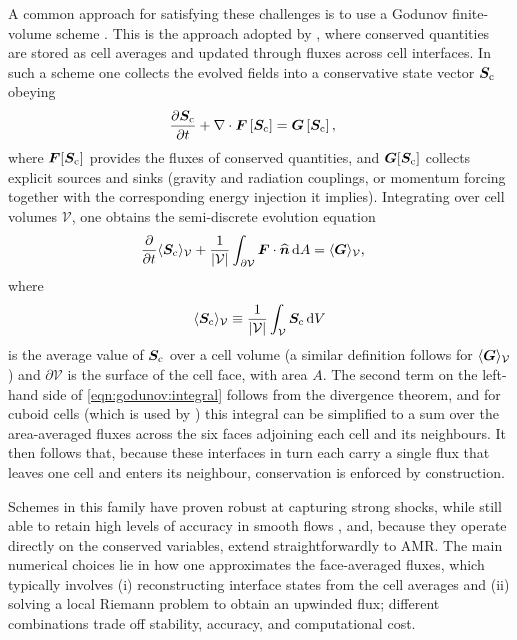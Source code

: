 A common approach for satisfying these challenges is to use a Godunov finite-volume scheme \citep{Toro97a}. This is the approach adopted by \quokka, where conserved quantities are stored as cell averages and updated through fluxes across cell interfaces. In such a scheme one collects the evolved fields into a conservative state vector $\bm{S}_\mathrm{c}$ obeying
\begin{align}
    \frac{\partial \bm{S}_\mathrm{c}}{\partial t}
        + \nabla\cdot\bm{F}\left[ \bm{S}_\mathrm{c} \right]
        &= \bm{G}\left[ \bm{S}_\mathrm{c} \right]
    , \label{eqn:godunov:conservation-law}
\end{align}
where $\bm{F}[\bm{S}_\mathrm{c}]$ provides the fluxes of conserved quantities, and $\bm{G}[\bm{S}_\mathrm{c}]$ collects explicit sources and sinks (\eg gravity and radiation couplings, or momentum forcing together with the corresponding energy injection it implies). Integrating over cell volumes $\mathcal{V}$, one obtains the semi-discrete evolution equation
\begin{align}
    \frac{\partial}{\partial t} \langle \bm{S}_\mathrm{c}\rangle_\mathcal{V}
        + \frac{1}{|\mathcal{V}|} \int_{\partial\mathcal{V}}
            \bm{F} \cdot \widehat{\bm{n}}
       \, \mathrm{d} A
        &= \langle \bm{G} \rangle_\mathcal{V}
    , \label{eqn:godunov:integral}
\end{align}
where
\begin{align}
    \langle \bm{S}_\mathrm{c}\rangle_\mathcal{V}
        \equiv \frac{1}{|\mathcal{V}|} \int_\mathcal{V}
            \bm{S}_\mathrm{c}
       \, \mathrm{d} V
\end{align}
is the average value of $\bm{S}_\mathrm{c}$ over a cell volume (a similar definition follows for $\langle\bm{G}\rangle_\mathcal{V}$) and $\partial\mathcal{V}$ is the surface of the cell face, with area $A$. The second term on the left-hand side of \cref{eqn:godunov:integral} follows from the divergence theorem, and for cuboid cells (which is used by \quokka) this integral can be simplified to a sum over the area-averaged fluxes across the six faces adjoining each cell and its neighbours. It then follows that, because these interfaces in turn each carry a single flux that leaves one cell and enters its neighbour, conservation is enforced by construction.

Schemes in this family have proven robust at capturing strong shocks, while still able to retain high levels of accuracy in smooth flows \citep{kritsuk2011comparing}, and, because they operate directly on the conserved variables, extend straightforwardly to AMR. The main numerical choices lie in how one approximates the face-averaged fluxes, which typically involves (i) reconstructing interface states from the cell averages and (ii) solving a local Riemann problem to obtain an upwinded flux; different combinations trade off stability, accuracy, and computational cost.

